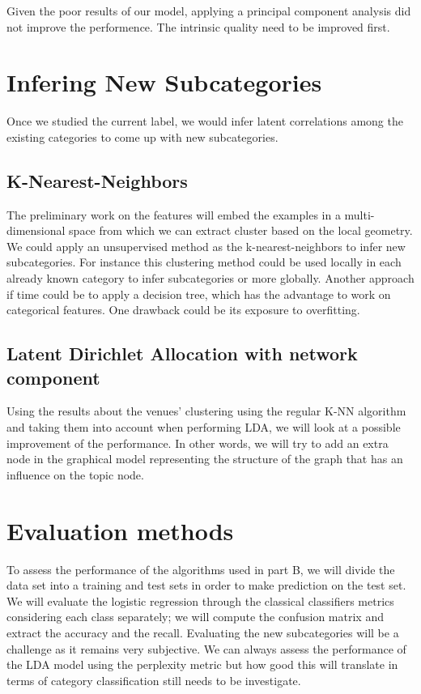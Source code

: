 \documentclass[submit]{harvardml}
\begin{document}
Given the poor results of our model, applying a principal component analysis did not improve the performence. The intrinsic quality need to be improved first. 

\section{Infering New Subcategories}

Once we studied the current label, we would infer latent correlations among the existing categories to come up with new subcategories.

\subsection{K-Nearest-Neighbors}
The preliminary work on the features will embed the examples in a multi-dimensional space from which we can extract cluster based on the local geometry. We could apply an unsupervised method as the k-nearest-neighbors to infer new subcategories. For instance this clustering method could be used locally in each already known category to infer subcategories or more globally. Another approach if time could be to apply a decision tree, which has the advantage to work on categorical features. One drawback could be its exposure to overfitting.

\subsection{Latent Dirichlet Allocation with network component}

Using the results about the venues' clustering using the regular K-NN algorithm and taking them into account when performing LDA, we will look at a possible improvement of the performance. In other words, we will try to add an extra node in the graphical model representing the structure of the graph that has an influence on the topic node.

\section{Evaluation methods}
 
To assess the performance of the algorithms used in part B, we will divide the data set into a training and test sets in order to make prediction on the test set. We will evaluate the logistic regression through the classical classifiers metrics considering each class separately; we will compute the confusion matrix and extract the accuracy and the recall. 
Evaluating the new subcategories will be a challenge as it remains very subjective. We can always assess the performance of the LDA model using the perplexity metric but how good this will translate in terms of category classification still needs to be investigate.
\end{document}
